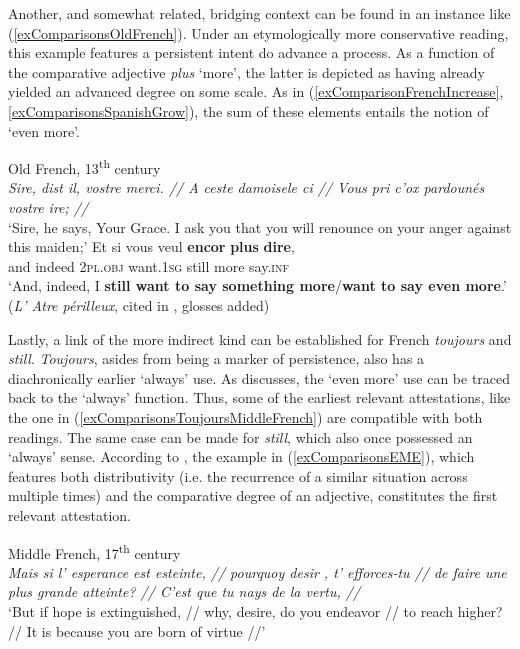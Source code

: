 {Another, and somewhat related, bridging context can be found in an instance like (\ref{exComparisonsOldFrench}). Under an etymologically more conservative reading, this example features a persistent intent do advance a process. As a function of the comparative adjective \textit{plus} \lq more\rq{}, the latter is depicted as having already yielded an advanced degree on some scale. As in (\ref{exComparisonFrenchIncrease}, \ref{exComparisonsSpanishGrow}), the sum of these elements entails the notion of \lq even more\rq{}. 

\begin{exe}
	\ex Old French, 13\textsuperscript{th} century\label{exComparisonsOldFrench}\\
	\textit{Sire, dist il, vostre merci. // A ceste damoisele ci // Vous pri c’ox pardounés vostre ire; //}
	\\ \lq Sire, he says, Your Grace. I ask you that you will renounce on your anger against this maiden;\rq{}
	\sn
	\gll Et si vous veul \textbf{encor} \textbf{plus} \textbf{dire},\\
	and indeed 2\textsc{pl}.\textsc{obj} want.1\textsc{sg} still more say.\textsc{inf}\\
	\glt \lq And, indeed, I \textbf{still want to say something more}/\textbf{want to say even more}.\rq{ }(\textit{L’ Atre périlleux}, cited in \cite[167]{MosegaardHansen2008}, glosses added)
\end{exe}

Lastly, a link of the more indirect kind can be established for French \textit{toujours} and  \textit{still}. \textit{Toujours}, asides from being a marker of persistence, also has a diachronically earlier \lq always\rq{ }use. As \textcite[167]{MosegaardHansen2008} discusses, the \lq even more\rq{ }use can be traced back to the \lq always\rq{ }function. Thus, some of the earliest relevant attestations, like the one in (\ref{exComparisonsToujoursMiddleFrench}) are compatible with both readings.  The same case can be made for  \textit{still}, which also once possessed an \lq always\rq{ }sense. According to \textcite{Lewis2019}, the example in (\ref{exComparisonsEME}), which features both distributivity (i.e. the recurrence of a similar situation across multiple times) and the comparative degree of an adjective, constitutes the first relevant attestation.  

\begin{exe}
	\ex Middle French,  17\textsuperscript{th} century\label{exComparisonsToujoursMiddleFrench}\\
	\textit{Mais si l’ esperance est esteinte, // pourquoy desir , t’ efforces-tu // de faire une plus grande atteinte? // C’est que tu nays de la vertu, //}\\
	\lq But if hope is extinguished, // why, desire, do you endeavor // to reach higher? // It is because you are born of virtue //\rq{}
	

\end{exe}}
